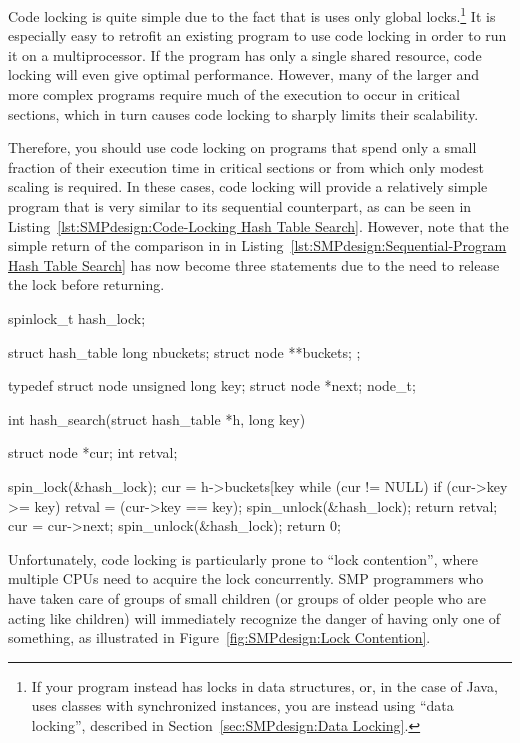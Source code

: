 %
Code locking is quite simple due to the fact that is uses only
global locks.\footnote{
	If your program instead has locks in data structures,
	or, in the case of Java, uses classes with synchronized
	instances, you are instead using ``data locking'', described
	in Section~\ref{sec:SMPdesign:Data Locking}.}
It is especially
easy to retrofit an existing program to use code locking in
order to run it on a multiprocessor.  If the program has
only a single shared resource, code locking will even give
optimal performance.
However, many of the larger and more complex programs
require much of the execution to
occur in critical sections, which in turn causes code locking
to sharply limits their scalability.

Therefore, you should use code locking on programs that spend
only a small fraction of their execution time in critical sections or
from which only modest scaling is required.  In these cases,
code locking will provide a relatively simple program that is
very similar to its sequential counterpart,
as can be seen in
Listing~\ref{lst:SMPdesign:Code-Locking Hash Table Search}.
However, note that the simple return of the comparison in
 in
Listing~\ref{lst:SMPdesign:Sequential-Program Hash Table Search}
has now become three statements due to the need to release the
lock before returning.

\begin{listing}[tbhp]
\begin{VerbatimL}[commandchars=\\\[\]]
spinlock_t hash_lock;

struct hash_table
{
	long nbuckets;
	struct node **buckets;
};

typedef struct node {
	unsigned long key;
	struct node *next;
} node_t;

int hash_search(struct hash_table *h, long key)
{
	struct node *cur;
	int retval;

	spin_lock(&hash_lock);
	cur = h->buckets[key %
	while (cur != NULL) {
		if (cur->key >= key) {
			retval = (cur->key == key);
			spin_unlock(&hash_lock);
			return retval;
		}
		cur = cur->next;
	}
	spin_unlock(&hash_lock);
	return 0;
}
\end{VerbatimL}
\caption{Code-Locking Hash Table Search}
\label{lst:SMPdesign:Code-Locking Hash Table Search}
\end{listing}

Unfortunately, code locking is particularly prone to ``lock contention'',
where multiple CPUs need to acquire the lock concurrently.
SMP programmers who have taken care of groups of small children
(or groups of older people who are acting like children) will immediately
recognize the danger of having only one of something,
as illustrated in Figure~\ref{fig:SMPdesign:Lock Contention}.


